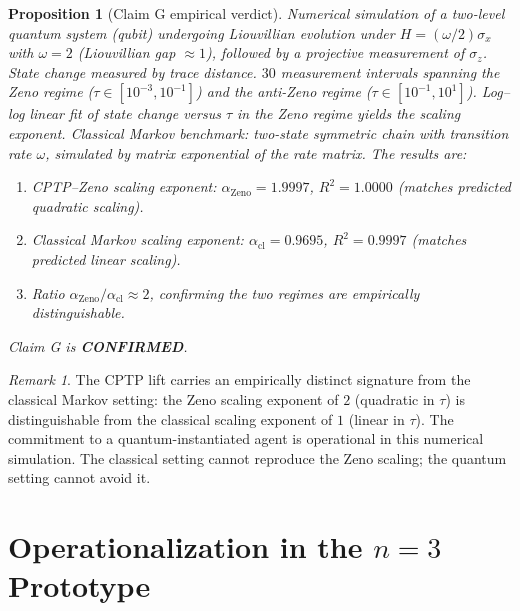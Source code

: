 \documentclass[11pt,a4paper]{article}
\theoremstyle{plain}
\newtheorem{proposition}[theorem]{Proposition}
\theoremstyle{definition}
\theoremstyle{remark}
\newtheorem{remark}[theorem]{Remark}
\begin{document}
\begin{proposition}[Claim G empirical verdict]\label{prop:claimG}
Numerical simulation of a two-level quantum system (qubit) undergoing
Liouvillian evolution under $H=(\omega/2)\sigma_x$ with $\omega=2$
(Liouvillian gap $\approx 1$), followed by a projective measurement of
$\sigma_z$. State change measured by trace distance. $30$ measurement
intervals spanning the Zeno regime ($\tau\in[10^{-3}, 10^{-1}]$) and the
anti-Zeno regime ($\tau\in[10^{-1}, 10^{1}]$). Log--log linear fit of
state change versus $\tau$ in the Zeno regime yields the scaling
exponent. Classical Markov benchmark: two-state symmetric chain with
transition rate $\omega$, simulated by matrix exponential of the rate
matrix. The results are:
\begin{enumerate}[leftmargin=*,itemsep=2pt]
\item CPTP--Zeno scaling exponent: $\alpha_{\mathrm{Zeno}} = 1.9997$,
$R^2 = 1.0000$ (matches predicted quadratic scaling).
\item Classical Markov scaling exponent: $\alpha_{\mathrm{cl}} = 0.9695$,
$R^2 = 0.9997$ (matches predicted linear scaling).
\item Ratio $\alpha_{\mathrm{Zeno}}/\alpha_{\mathrm{cl}}\approx 2$,
confirming the two regimes are empirically distinguishable.
\end{enumerate}
Claim G is \textbf{CONFIRMED}.
\end{proposition}

\begin{remark}
The CPTP lift carries an empirically distinct signature from the
classical Markov setting: the Zeno scaling exponent of $2$ (quadratic
in $\tau$) is distinguishable from the classical scaling exponent of
$1$ (linear in $\tau$). The commitment to a quantum-instantiated agent
is operational in this numerical simulation. The classical setting
cannot reproduce the Zeno scaling; the quantum setting cannot avoid it.
\end{remark}

\section{Operationalization in the $n=3$ Prototype}\label{sec:n3}
\end{document}
